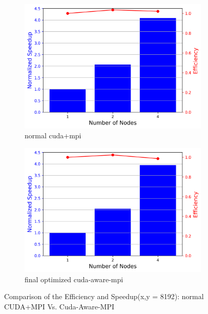 \documentclass[article]{scrartcl}
\begin{document}
\begin{figure}[htpb]
    \centering
    \begin{subfigure}{.4\textwidth}
        \includegraphics[width=\textwidth,keepaspectratio=true]{../figs/SpeedUp_Eff_COMM_CUDA.png}
        \caption{normal cuda+mpi}
        \label{fig:finalcuda}
    \end{subfigure}
%
    \begin{subfigure}{.4\textwidth}
    	\includegraphics[width=\textwidth,keepaspectratio=true]{../figs/final_optimized.png}
    	\caption{final optimized cuda-aware-mpi}
    	\label{fig:finalcudaAware}
    \end{subfigure}
	\caption{Comparison of the Efficiency and Speedup(x,y = 8192): normal CUDA+MPI Vs. Cuda-Aware-MPI}
	\label{fig:final}
\end{figure}
\end{document}
